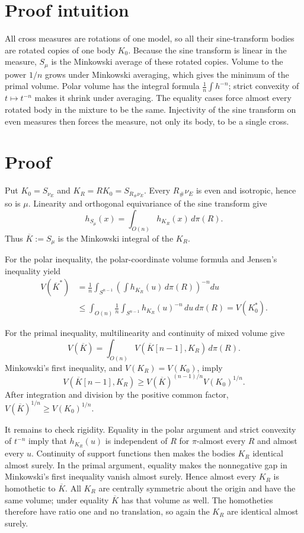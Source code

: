 \documentclass[11pt]{article}
\newcommand{\Sph}{S^{n-1}}
\newcommand{\vol}{V}
\begin{document}
\section{Proof intuition}

All cross measures are rotations of one model, so all their sine-transform
bodies are rotated copies of one body $K_0$.  Because the sine transform is
linear in the measure, $S_\mu$ is the Minkowski average of these rotated
copies.  Volume to the power $1/n$ grows under Minkowski averaging, which
gives the minimum of the primal volume.  Polar volume has the integral
formula $\frac1n\int h^{-n}$; strict convexity of $t\mapsto t^{-n}$ makes it
shrink under averaging.  The equality cases force almost every rotated body
in the mixture to be the same.  Injectivity of the sine transform on even
measures then forces the measure, not only its body, to be a single cross.

\section{Proof}

Put $K_0=S_{\nu_E}$ and $K_R=RK_0=S_{R_\#\nu_E}$.  Every
$R_\#\nu_E$ is even and isotropic, hence so is $\mu$.  Linearity and
orthogonal equivariance of the sine transform give
\begin{equation}\label{eq:Minkowski}
 h_{S_\mu}(x)=\int_{O(n)}h_{K_R}(x)\,d\pi(R).
\end{equation}
Thus $\overline K:=S_\mu$ is the Minkowski integral of the $K_R$.

For the polar inequality, the polar-coordinate volume formula and Jensen's
inequality yield
\begin{align*}
 \vol(\overline K^*)
 &=\frac1n\int_{\Sph}\left(\int h_{K_R}(u)\,d\pi(R)\right)^{-n}du\\
 &\le \int_{O(n)}\frac1n\int_{\Sph}h_{K_R}(u)^{-n}\,du\,d\pi(R)
 =\vol(K_0^*).
\end{align*}

For the primal inequality, multilinearity and continuity of mixed volume give
\[
 \vol(\overline K)
 =\int_{O(n)}V(\overline K[n-1],K_R)\,d\pi(R).
\]
Minkowski's first inequality, and $\vol(K_R)=\vol(K_0)$, imply
\[
 V(\overline K[n-1],K_R)
 \ge \vol(\overline K)^{(n-1)/n}\vol(K_0)^{1/n}.
\]
After integration and division by the positive common factor,
$\vol(\overline K)^{1/n}\ge\vol(K_0)^{1/n}$.

It remains to check rigidity.  Equality in the polar argument and strict
convexity of $t^{-n}$ imply that $h_{K_R}(u)$ is independent of $R$ for
$\pi$-almost every $R$ and almost every $u$.  Continuity of support functions
then makes the bodies $K_R$ identical almost surely.  In the primal argument,
equality makes the nonnegative gap in Minkowski's first inequality vanish
almost surely.  Hence almost every $K_R$ is homothetic to $\overline K$.
All $K_R$ are centrally symmetric about the origin and have the same volume;
under equality $\overline K$ has that volume as well.  The homotheties
therefore have ratio one and no translation, so again the $K_R$ are identical
almost surely.
\end{document}
